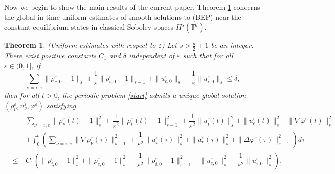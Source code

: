 \documentclass[reqno,twoside,12pt,a4paper]{amsart}
\newcommand{\T}{\mathbb{T}}
\newcommand{\eps}{\mathbb{\varepsilon}}
\newcommand{\D}{\nabla}
\newcommand{\vp}{\varphi}
\newtheorem{theorem}{Theorem}[section]
\numberwithin{equation}{section}
\begin{document}
Now we begin to show the main results of the current paper. Theorem \ref{Thm2.2} concerns the global-in-time uniform estimates of smooth solutions to (BEP) near the constant equilibrium states in classical Sobolev spaces $H^s(\T^d)$.
\begin{theorem}\label{Thm2.2} (Uniform estimates with respect to $\eps$)
   Let $s>\frac{d}{2}+1$ be an integer. There exist positive constants $C_1$ and $\delta$ independent of $\eps$ such that for all $\eps\in(0,1]$, if
  \begin{equation*}\label{delta}
   \sum_{\nu=i,e}\|\rho_{\nu,0}^\eps-1\|_s+\dfrac{1}{\eps}\|\rho_{i,0}^\eps-1\|_{s-1}+\|u_{e,0}^\eps\|_s+\dfrac{1}{\eps}\|u_{i,0}^\eps\|_s\leq \delta,
  \end{equation*}
then for all $t>0$, the periodic problem \eqref{start} admits a unique global solution $(\rho_\nu^\eps, u_\nu^\eps, \varphi ^\eps)$ satisfying
\begin{eqnarray}\label{finestim}
&\quad& \sum_{\nu=i,e}\|\rho_\nu^\eps(t)-1\|_s^2+\dfrac{1}{\eps^2}\|\rho_i^\eps(t)-1\|_{s-1}^2+\dfrac{1}{\eps^2}\|u_i^\eps(t)\|_s^2
+\|u_e^\eps(t)\|_s^2+\|\D\vp^\eps(t)\|_s^2\nonumber\\
&&+\int_0^t\left(\sum_{\nu=i,e}\|\nabla \rho_\nu^\eps(\tau)\|_{s-1}^2+\dfrac{1}{\eps^2}\|u_i^\eps(\tau)\|_s^2+\|u_e^\eps(\tau)\|_s^2
+\|\Delta \vp^\eps(\tau)\|_{s-1}^2\right)d\tau\nonumber\\
&\leq&C_1\left(\|\rho_{i,0}^\eps-1\|_s^2+\|\rho_{e,0}^\eps-1\|_s^2+\dfrac{1}{\eps^2}\|\rho_{i,0}^\eps-1\|_{s-1}^2+\|u_{e,0}^\eps\|_s^2+\dfrac{1}{\eps^2}\|u_{i,0}^\eps\|_s^2\right).
  \end{eqnarray}
\end{theorem}
\end{document}
